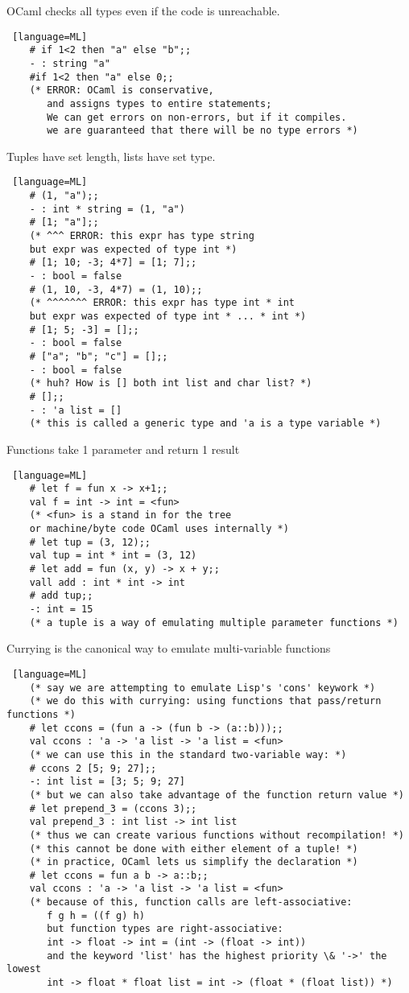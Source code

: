 \documentclass[../../lecture_notes.tex]{subfiles}
\begin{document}
\noindent OCaml checks all types even if the code is unreachable.
\begin{lstlisting} [language=ML]
	# if 1<2 then "a" else "b";;
	- : string "a"
	#if 1<2 then "a" else 0;;
	(* ERROR: OCaml is conservative, 
	   and assigns types to entire statements;
	   We can get errors on non-errors, but if it compiles.
	   we are guaranteed that there will be no type errors *)
\end{lstlisting} \medskip

\noindent Tuples have set length, lists have set type.
\begin{lstlisting} [language=ML]
	# (1, "a");;
	- : int * string = (1, "a")
	# [1; "a"];;
	(* ^^^ ERROR: this expr has type string 
	but expr was expected of type int *)
	# [1; 10; -3; 4*7] = [1; 7];;
	- : bool = false
	# (1, 10, -3, 4*7) = (1, 10);;
	(* ^^^^^^^ ERROR: this expr has type int * int
	but expr was expected of type int * ... * int *)
	# [1; 5; -3] = [];;
	- : bool = false
	# ["a"; "b"; "c"] = [];;
	- : bool = false
	(* huh? How is [] both int list and char list? *)
	# [];;
	- : 'a list = []
	(* this is called a generic type and 'a is a type variable *)
\end{lstlisting} \medskip

\noindent Functions take 1 parameter and return 1 result
\begin{lstlisting} [language=ML]
	# let f = fun x -> x+1;;
	val f = int -> int = <fun>
	(* <fun> is a stand in for the tree 
	or machine/byte code OCaml uses internally *)
	# let tup = (3, 12);;
	val tup = int * int = (3, 12)
	# let add = fun (x, y) -> x + y;;
	vall add : int * int -> int
	# add tup;;
	-: int = 15
	(* a tuple is a way of emulating multiple parameter functions *)
\end{lstlisting} \medskip

\noindent Currying is the canonical way to emulate multi-variable functions
\begin{lstlisting} [language=ML]
	(* say we are attempting to emulate Lisp's 'cons' keywork *)
	(* we do this with currying: using functions that pass/return functions *)
	# let ccons = (fun a -> (fun b -> (a::b)));;
	val ccons : 'a -> 'a list -> 'a list = <fun>
	(* we can use this in the standard two-variable way: *)
	# ccons 2 [5; 9; 27];;
	-: int list = [3; 5; 9; 27]
	(* but we can also take advantage of the function return value *)
	# let prepend_3 = (ccons 3);;
	val prepend_3 : int list -> int list
	(* thus we can create various functions without recompilation! *)
	(* this cannot be done with either element of a tuple! *)
	(* in practice, OCaml lets us simplify the declaration *)
	# let ccons = fun a b -> a::b;;
	val ccons : 'a -> 'a list -> 'a list = <fun>
	(* because of this, function calls are left-associative:
	   f g h = ((f g) h)
	   but function types are right-associative:
	   int -> float -> int = (int -> (float -> int))
	   and the keyword 'list' has the highest priority \& '->' the lowest
	   int -> float * float list = int -> (float * (float list)) *)
\end{lstlisting} \medskip
\end{document}
